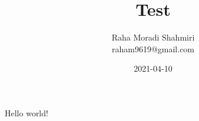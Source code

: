 \documentclass{article}
\title{Test}
\date{2021-04-10}
\author{Raha Moradi Shahmiri\\raham9619@gmail.com}
\begin{document}
	\maketitle
	\newpage

	Hello world!
\end{document}
